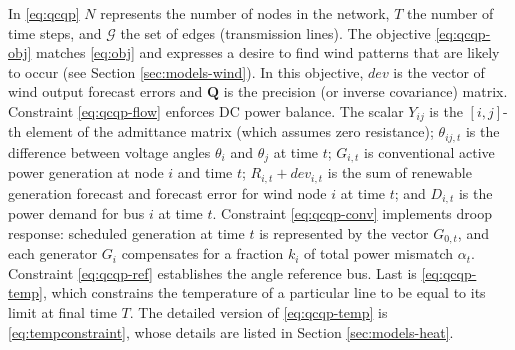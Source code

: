 \documentclass[journal,twoside]{IEEEtran}
\begin{document}
%
%
%
%
%
%
%
In \eqref{eq:qcqp} $N$ represents the number of nodes in the network, $T$ the number of time steps, and $\mathcal{G}$ the set of edges (transmission lines). The objective \eqref{eq:qcqp-obj} matches \eqref{eq:obj} and expresses a desire to find wind patterns that are likely to occur (see Section \ref{sec:models-wind}). In this objective, $dev$ is the vector of wind output forecast errors and $\mathbf{Q}$ is the precision (or inverse covariance) matrix. Constraint \eqref{eq:qcqp-flow} enforces DC power balance. The scalar $Y_{ij}$ is the $[i,j]$-th element of the admittance matrix (which assumes zero resistance); $\theta_{ij,t}$ is the difference between voltage angles $\theta_i$ and $\theta_j$ at time $t$; $G_{i,t}$ is conventional active power generation at node $i$ and time $t$; $R_{i,t} + dev_{i,t}$ is the sum of renewable generation forecast and forecast error for wind node $i$ at time $t$; and $D_{i,t}$ is the power demand for bus $i$ at time $t$. Constraint \eqref{eq:qcqp-conv} implements droop response: scheduled generation at time $t$ is represented by the vector $G_{0,t}$, and each generator $G_i$ compensates for a fraction $k_i$ of total power mismatch $\alpha_t$. Constraint \eqref{eq:qcqp-ref} establishes the angle reference bus. Last is \eqref{eq:qcqp-temp}, which constrains the temperature of a particular line to be equal to its limit at final time $T$. The detailed version of \eqref{eq:qcqp-temp} is \eqref{eq:tempconstraint}, whose details are listed in Section \ref{sec:models-heat}.
\end{document}
